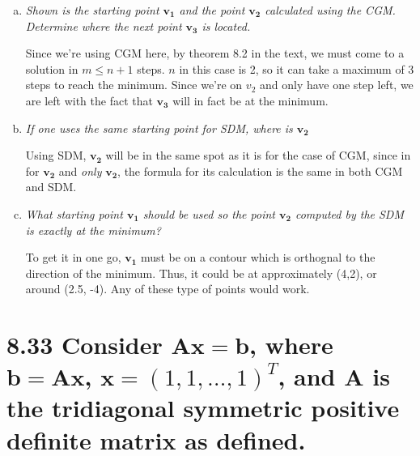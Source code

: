 \documentclass{article}
\let\vec\mathbf
\begin{document}
\begin{enumerate}[(a)]
  \item \textit{Shown is the starting point $\vec{v_1}$ and the point $\vec{v_2}$ calculated using the CGM. Determine where the next point $\vec{v_3}$ is located.}

    Since we're using CGM here, by theorem 8.2 in the text, we must come to a solution in $m \leq n+1$ steps. $n$ in this case is 2, so it can take a maximum of 3 steps to reach the minimum. Since we're on $v_2$ and only have one step left, we are left with the fact that $\vec{v_3}$ will in fact be at the minimum.  
  \item \textit{If one uses the same starting point for SDM, where is $\vec{v_2}$}

    Using SDM, $\vec{v_2}$ will be in the same spot as it is for the case of CGM, since in for $\vec{v_2}$ and \textit{only} $\vec{v_2}$, the formula for its calculation is the same in both CGM and SDM.
  \item \textit{What starting point $\vec{v_1}$ should be used so the point $\vec{v_2}$ computed by the SDM is exactly at the minimum?}

    To get it in one go, $\vec{v_1}$ must be on a contour which is orthognal to the direction of the minimum. Thus, it could be at approximately (4,2), or around (2.5, -4). Any of these type of points would work. 
\end{enumerate}






\section*{8.33 \normalsize Consider $\vec{A}\vec{x} = \vec{b}$, where $\vec{b} = \vec{A}\vec{x}$, $\vec{x} = (1,1,\dots,1)^T$, and $\vec{A}$ is the tridiagonal symmetric positive definite matrix as defined.}
\end{document}
